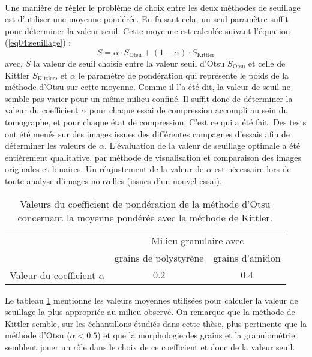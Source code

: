 			\paragraph{}Une manière de régler le problème de choix entre les deux méthodes de seuillage est d'utiliser une moyenne pondérée. En faisant cela, un seul paramètre suffit pour déterminer la valeur seuil. Cette moyenne est calculée suivant l'équation (\ref{eq04:seuillage}) :
			\begin{equation}\label{eq04:seuillage}
			S = \alpha\cdot S_\textrm{Otsu} + \left(1-\alpha\right)\cdot S_\textrm{Kittler}
			\end{equation}
			avec, $S$ la valeur de seuil choisie entre la valeur seuil d'Otsu $S_\textrm{Otsu}$ et celle de Kittler $S_\textrm{Kittler}$, et $\alpha$ le paramètre de pondération qui représente le poids de la méthode d'Otsu sur cette moyenne. Comme il l'a été dit, la valeur de seuil ne semble pas varier pour un même milieu confiné. Il suffit donc de déterminer la valeur du coefficient $\alpha$ pour chaque essai de compression accompli au sein du tomographe, et pour chaque état de compression. C'est ce qui a été fait. Des tests ont été menés sur des images issues des différentes campagnes d'essais afin de déterminer les valeurs de $\alpha$. L'évaluation de la valeur de seuillage optimale a été entièrement qualitative, par méthode de visualisation et comparaison des images originales et binaires. Un réajustement de la valeur de $\alpha$ est nécessaire lors de toute analyse d'images nouvelles (issues d'un nouvel essai).
			\begin{table}\centering
				\begin{tabular}{ccc}
					\hline
					& \multicolumn{2}{c}{Milieu granulaire avec}\\
					& grains de polystyrène & grains d'amidon \\\hline
					Valeur du coefficient $\alpha$ & $0.2$ & $0.4$ \\\hline
				\end{tabular}
				\caption{\label{tab04:valeur_alpha}Valeurs du coefficient de pondération de la méthode d'Otsu concernant la moyenne pondérée avec la méthode de Kittler.}
			\end{table}
			Le tableau \ref{tab04:valeur_alpha} mentionne les valeurs moyennes utilisées pour calculer la valeur de seuillage la plus appropriée au milieu observé. On remarque que la méthode de Kittler semble, sur les échantillons étudiés dans cette thèse, plus pertinente que la méthode d'Otsu ($\alpha < 0.5$) et que la morphologie des grains et la granulométrie semblent jouer un rôle dans le choix de ce coefficient et donc de la valeur seuil.

